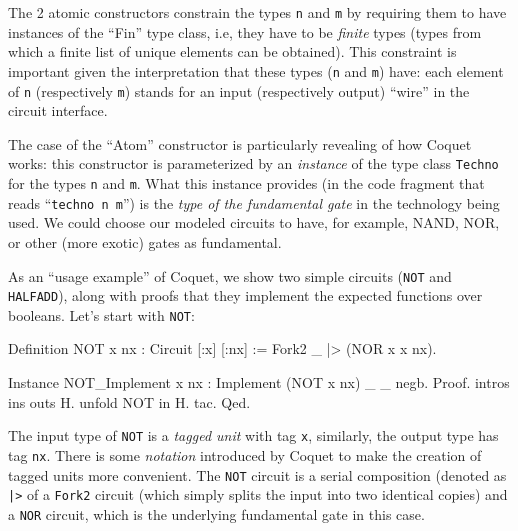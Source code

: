 \documentclass[a4paper]{article}
\begin{document}
                The 2 atomic constructors constrain the types \texttt{n} and \texttt{m} by requiring
                them to have instances of the ``Fin'' type class, i.e, they have to be \emph{finite}
                types (types from which a finite list of unique elements can be obtained). This
                constraint is important given the interpretation that these types (\texttt{n} and
                \texttt{m}) have: each element of \texttt{n} (respectively \texttt{m}) stands for an
                input (respectively output) ``wire'' in the circuit interface.

                The case of the ``Atom'' constructor is particularly revealing of how Coquet works:
                this constructor is parameterized by an \emph{instance} of the type class
                \texttt{Techno} for the types \texttt{n} and \texttt{m}. What this instance provides
                (in the code fragment that reads ``\texttt{techno n m}'') is the \emph{type of the
                    fundamental gate} in the technology being used. We could choose our modeled
                circuits to have, for example, NAND, NOR, or other (more exotic) gates as
                fundamental.

                As an ``usage example'' of Coquet, we show two simple circuits (\texttt{NOT} and
                \texttt{HALFADD}), along with proofs that they implement the expected functions over
                booleans. Let's start with \texttt{NOT}:
                \begin{coqcode}
        Definition NOT x nx : Circuit [:x] [:nx]  :=  Fork2 _ |> (NOR x x nx).

        Instance NOT_Implement {x nx} : Implement (NOT x nx) _ _ negb.
        Proof.
            intros ins outs H.
            unfold NOT in H.
            tac.
        Qed.
                \end{coqcode}

                The input type of \texttt{NOT} is a \emph{tagged unit} with tag \texttt{x},
                similarly, the output type has tag \texttt{nx}. There is some \emph{notation}
                introduced by Coquet to make the creation of tagged units more convenient. The
                \texttt{NOT} circuit is a serial composition (denoted as \texttt{|>} of a
                \texttt{Fork2} circuit (which simply splits the input into two identical copies) and
                a \texttt{NOR} circuit, which is the underlying fundamental gate in this case.
\end{document}
